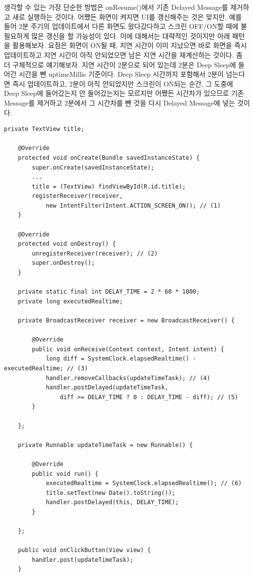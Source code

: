 생각할 수 있는 가장 단순한 방법은 onResume()에서 기존 Delayed Message를 제거하고 새로 실행하는 것이다. 어쨌든 화면이 켜지면 UI를 갱신해주는 것은 맞지만, 예를 들어 2분 주기의 업데이트에서 다른 화면도 왔다갔다하고 스크린 OFF/ON할 때에 불필요하게 많은 갱신을 할 가능성이 있다.
이에 대해서는 대략적인 것이지만 아래 패턴을 활용해보자. 
요점은 화면이 ON될 때, 지연 시간이 이미 지났으면 바로 화면을 즉시 업데이트하고 지연 시간이 아직 안되었으면 남은 지연 시간을 재계산하는 것이다. 
좀 더 구체적으로 얘기해보자. 지연 시간이 2분으로 되어 있는데 2분은 Deep Sleep에 들어간 시간을 뺀 uptimeMillis 기준이다. Deep Sleep 시간까지 포함해서 2분이 넘는다면 즉시 업데이트하고, 2분이 아직 안되었지만 스크린이 ON되는 순간, 그 도중에 Deep Sleep에 들어갔는지 안 들어갔는지는 모르지만 어쨌든 시간차가 있으므로 기존 Message를 제거하고 2분에서 그 시간차를 뺀 것을 다시 Delayed Message에 넣는 것이다.
\begin{lstlisting}[frame=single]
	private TextView title;

    @Override
    protected void onCreate(Bundle savedInstanceState) {
        super.onCreate(savedInstanceState);
        ...
		title = (TextView) findViewById(R.id.title);
		registerReceiver(receiver, 
			new IntentFilter(Intent.ACTION_SCREEN_ON)); // (1)
    }
    
    @Override
	protected void onDestroy() {
		unregisterReceiver(receiver); // (2)
		super.onDestroy();
	}
	
	private static final int DELAY_TIME = 2 * 60 * 1000;
	private long executedRealtime;

	private BroadcastReceiver receiver = new BroadcastReceiver() {

		@Override
		public void onReceive(Context context, Intent intent) {
			long diff = SystemClock.elapsedRealtime() - executedRealtime; // (3)
			handler.removeCallbacks(updateTimeTask); // (4)
			handler.postDelayed(updateTimeTask, 
				diff >= DELAY_TIME ? 0 : DELAY_TIME - diff); // (5)
		}

	};

	private Runnable updateTimeTask = new Runnable() {

		@Override
		public void run() {
			executedRealtime = SystemClock.elapsedRealtime(); // (6)
			title.setText(new Date().toString());
			handler.postDelayed(this, DELAY_TIME);
		}

	};

	public void onClickButton(View view) {
		handler.post(updateTimeTask);
	}
\end{lstlisting}
